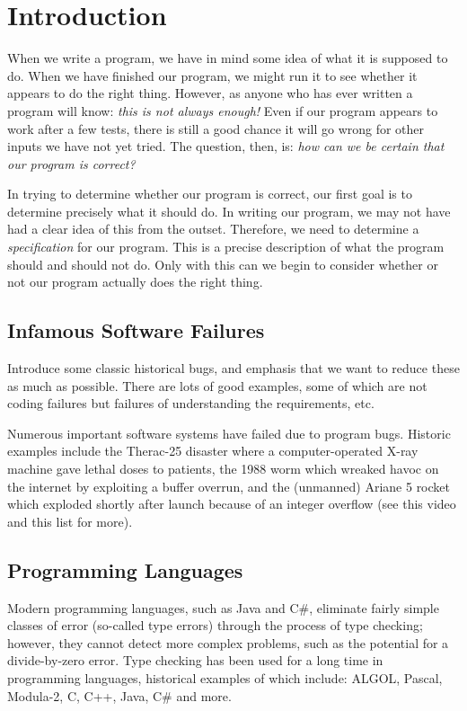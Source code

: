 \chapter{Introduction}
When we write a program, we have in mind some idea of what it is supposed to do.  When we have finished our program, we might run it to see whether it appears to do the right thing.  However, as anyone who has ever written a program will know: {\em this is not always enough!}  Even if our program appears to work after a few tests, there is still a good chance it will go wrong for other inputs we have not yet tried.  The question, then, is: {\em how can we be certain that our program is correct?}

In trying to determine whether our program is correct, our first goal is to determine precisely what it should do.  In writing our program, we may not have had a clear idea of this from the outset.  Therefore, we need to determine a {\em specification} for our program.  This is a precise description of what the program should and should not do.  Only with this can we begin to consider whether or not our program actually does the right thing.


\section{Infamous Software Failures}

Introduce some classic historical bugs, and emphasis that we want to reduce these as much as possible.  There are lots of good examples, some of which are not coding failures but failures of understanding the requirements, etc.

Numerous important software systems have failed due to program bugs. Historic examples include the Therac-25 disaster where a computer-operated X-ray machine gave lethal doses to patients, the 1988 worm which wreaked havoc on the internet by exploiting a buffer overrun, and the (unmanned) Ariane 5 rocket which exploded shortly after launch because of an integer overflow (see this video and this list for more).

\section{Programming Languages}

Modern programming languages, such as Java and C\#, eliminate fairly simple classes of error (so-called type errors) through the process of type checking; however, they cannot detect more complex problems, such as the potential for a divide-by-zero error. Type checking has been used for a long time in programming languages, historical examples of which include: ALGOL, Pascal, Modula-2, C, C++, Java, C\# and more.


